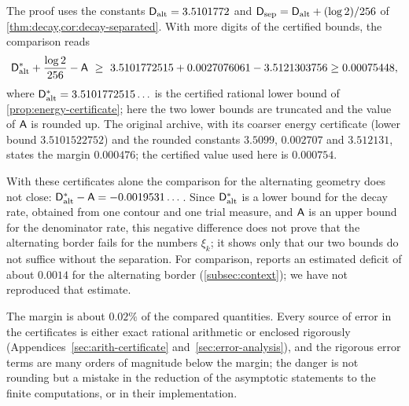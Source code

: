 The proof uses the constants $\mathsf{D}_{\mathrm{alt}}=3.5101772$ and $\mathsf{D}_{\mathrm{sep}}=\mathsf{D}_{\mathrm{alt}}+(\log2)/256$ of
\cref{thm:decay,cor:decay-separated}. With more digits of the certified bounds, the comparison
reads
\[
  \cD^{*}_{\alt}+\frac{\log2}{256}-\cA\ \ge\ 3.5101772515+0.0027076061-3.5121303756
  \ge0.00075448 ,
\]
where $\mathsf{D}^{*}_{\mathrm{alt}}=3.5101772515\ldots$ is the certified rational lower bound of
\cref{prop:energy-certificate}; here the two lower bounds are truncated and the value of $\mathsf{A}$ is
rounded up. The original archive, with its coarser energy certificate (lower bound
$3.5101522752$) and the rounded constants $3.5099$, $0.002707$ and $3.512131$, states the margin
$0.000476$; the certified value used here is $0.000754$.

With these certificates alone the comparison for the alternating geometry does not close:
$\mathsf{D}^{*}_{\mathrm{alt}}-\mathsf{A}=-0.0019531\ldots$\,. Since $\mathsf{D}^{*}_{\mathrm{alt}}$ is a lower bound for the decay rate,
obtained from one contour and one trial measure, and $\mathsf{A}$ is an upper bound for the denominator
rate, this negative difference does not prove that the alternating border fails for the numbers
$\xi_k$; it shows only that our two bounds do not suffice without the separation. For comparison,
\cite[\S12.1]{Litsey2026Lowner} reports an estimated deficit of about $0.0014$ for the alternating
border (\cref{subsec:context}); we have not reproduced that estimate.

The margin is about $0.02\%$ of the compared quantities. Every source of error in the
certificates is either exact rational arithmetic or enclosed rigorously
(Appendices~\ref{sec:arith-certificate} and~\ref{sec:error-analysis}), and the rigorous error
terms are many orders of magnitude below the margin; the danger is not rounding but a mistake in
the reduction of the asymptotic statements to the finite computations, or in their
implementation.

